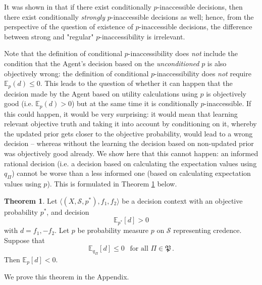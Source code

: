 \documentclass[10pt, letterpaper]{article}%
\theoremstyle{definition}
\newtheorem{theorem}{Theorem}[section]
\newcommand{\E}{\mathbb E}
\newcommand{\1}{\mathbf 1}
\begin{document}
It was shown in \cite{Redei-Jing2026} that if there exist conditionally $p$-inaccessible decisions, then there exist conditionally \emph{strongly} $p$-inaccessible decisions as well; hence, from the perspective of the question of existence of $p$-inaccessible decisions, the difference between strong and "regular" $p$-inaccessibility is irrelevant.   

Note that the definition of conditional $p$-inaccessibility does \emph{not} include the condition that the Agent's decision based on the \emph{unconditioned} $p$ is also objectively wrong:  the definition of conditional $p$-inaccessibility does \emph{not} require $\E_p(d)\leq 0$. This leads to the question of whether it can happen that the decision made by the Agent based on utility calculations using $p$ is objectively good (i.e. $\E_p(d)> 0$) but at the same time it is conditionally $p$-inaccessible. If this could happen, it would be very surprising: it would mean that learning relevant objective truth and taking it into account by conditioning on it, whereby the updated prior gets closer to the objective probability, would lead to a wrong decision -- whereas without the learning the decision based on non-updated prior was objectively good already. We show here that this cannot happen: an informed rational decision (i.e. a decision based on calculating the expectation values using $q_{\Pi}$) cannot be worse than a less informed one (based on calculating expectation values using $p$). This is formulated in Theorem \ref{thm:main2} below. 
\begin{theorem}\label{thm:main2}
	Let $\big\langle (X,\mathcal{S},{p}^*),f_1,f_2\big\rangle$ be a decision context with an objective probability $p^*$, and decision 
\begin{equation}
\E_{p^*}[d]>0
\end{equation} 
with $d=f_1,-f_2$. Let $p$ be  probability measure $p$ on $\mathcal{S}$ representing credence. Suppose that 
	\[
	\E_{q_\Pi}[d]\le 0\ \ \text{ for all }  \Pi\in\mathfrak{P}\,.
	\]
	Then $\E_p[d]<0$.	
\end{theorem}
We prove this theorem in the Appendix. 
\end{document}
